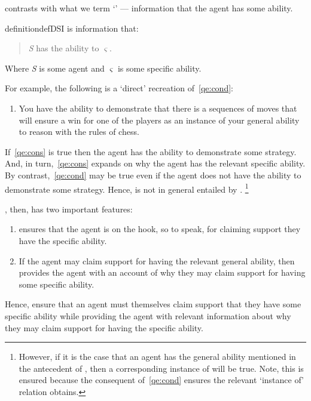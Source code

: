 \begin{note}
  \Gsi{} contrasts with what we term `\dsi{-}' --- information that the agent has some ability.
    \begin{restatable}[\dsi{}]{definition}{defDSI}\label{def:dsi}
    \Dsi{-} is information that:
    \begin{quote}
      \emph{S} has the ability to \(\varsigma\).
    \end{quote}
    Where \emph{S} is some agent and \(\varsigma\) is some specific ability.
  \end{restatable}
  For example, the following is a `direct' recreation of~\ref{qe:cond}:

  \begin{enumerate}[label=(\dsi{}:\arabic*), ref=(\dsi{}:\arabic*), series=dsi_count]
  \item\label{qe:cons} You have the ability to demonstrate that there is a sequences of moves that will ensure a win for one of the players as an instance of your general ability to reason with the rules of chess.
  \end{enumerate}

  If~\ref{qe:cons} is true then the agent has the ability to demonstrate some strategy.
  And, in turn,~\ref{qe:cons} expands on why the agent has the relevant specific ability.
  By contrast,~\ref{qe:cond} may be true even if the agent does not have the ability to demonstrate some strategy.
  Hence, \dsi{} is not in general entailed by \gsi{}.\nolinebreak
  \footnote{
    However, if it is the case that an agent has the general ability mentioned in the antecedent of \gsi{}, then a corresponding instance of \dsi{} will be true.
    Note, this is ensured because the consequent of~\ref{qe:cond} ensures the relevant `instance of' relation obtains.
  }
\end{note}

\begin{note}
  \gsi{}, then, has two important features:
  \begin{enumerate}
  \item \gsi{} ensures that the agent is on the hook, so to speak, for claiming support they have the specific ability.
  \item If the agent may claim support for having the relevant general ability, then \gsi{} provides the agent with an account of why they may claim support for having some specific ability.
  \end{enumerate}
  Hence, \gsi{} ensure that an agent must themselves claim support that they have some specific ability while providing the agent with relevant information about why they may claim support for having the specific ability.
\end{note}

